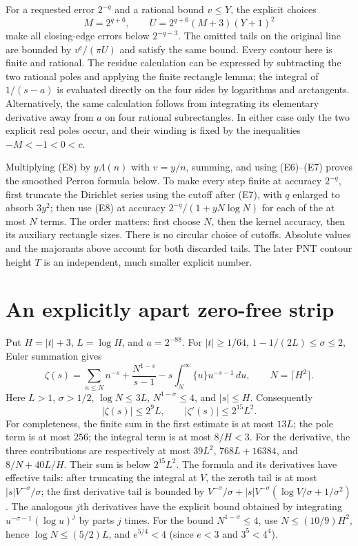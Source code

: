 For a requested error $2^{-q}$ and a rational bound $v\le Y$, the explicit
choices
\[
 M=2^{q+6},\qquad U=2^{q+6}(M+3)(Y+1)^2
\]
make all closing-edge errors below $2^{-q-3}$. The omitted tails on the
original line are bounded by $v^c/(\pi U)$ and satisfy the same bound.
Every contour here is finite and rational. The residue calculation can
be expressed by subtracting the two rational poles and applying the
finite rectangle lemma; the integral of $1/(s-a)$ is evaluated directly
on the four sides by logarithms and arctangents. Alternatively, the same
calculation follows from integrating its elementary derivative away
from $a$ on four rational subrectangles. In either case only the two
explicit real poles occur, and their winding is fixed by the inequalities
$-M<-1<0<c$.

Multiplying (E8) by $y\Lambda(n)$ with $v=y/n$, summing, and using
(E6)--(E7) proves the smoothed Perron formula below. To make every step
finite at accuracy $2^{-q}$, first truncate the Dirichlet series using
the cutoff after (E7), with $q$ enlarged to absorb $3y^2$; then use
(E8) at accuracy $2^{-q}/(1+yN\log N)$ for each of the at most $N$
terms. The order matters: first choose $N$, then the kernel accuracy,
then its auxiliary rectangle sizes. There is no circular choice of
cutoffs. Absolute values and the majorants above account for both
discarded tails. The later PNT contour height $T$ is an independent,
much smaller explicit number.

\section{An explicitly apart zero-free strip}
Put $H=|t|+3$, $L=\log H$, and $a=2^{-88}$. For
$|t|\ge 1/64$, $1-1/(2L)\le\sigma\le2$, Euler summation gives
\[
 \zeta(s)=\sum_{n\le N}n^{-s}+\frac{N^{1-s}}{s-1}
 -s\int_N^\infty\{u\}u^{-s-1}\,du,\qquad N=\lceil H^2\rceil.
\]
Here $L>1$, $\sigma>1/2$, $\log N\le3L$, $N^{1-\sigma}\le4$,
and $|s|\le H$. Consequently
\[
 |\zeta(s)|\le 2^9L,\qquad |\zeta'(s)|\le2^{15}L^2.                 \tag{A1}
\]
For completeness, the finite sum in the first estimate is at most $13L$;
the pole term is at most $256$; the integral term is at most $8/H<3$.
For the derivative, the three contributions are respectively at most
$39L^2$, $768L+16384$, and $8/N+40L/H$. Their sum is below $2^{15}L^2$.
The formula and its derivatives have effective tails: after truncating the
integral at $V$, the zeroth tail is at most $|s|V^{-\sigma}/\sigma$;
the first derivative tail is bounded by
$V^{-\sigma}/\sigma+|s|V^{-\sigma}(\log V/\sigma+1/\sigma^2)$.
The analogous $j$th derivatives have the explicit bound obtained by
integrating $u^{-\sigma-1}(\log u)^j$ by parts $j$ times.
For the bound $N^{1-\sigma}\le4$, use $N\le(10/9)H^2$, hence
$\log N\le(5/2)L$, and $e^{5/4}<4$ (since $e<3$ and $3^5<4^4$).

